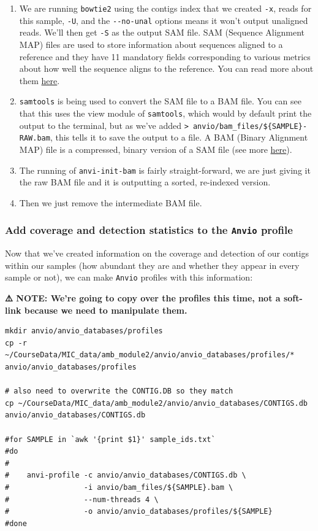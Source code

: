 \documentclass[
]{book}
\providecommand{\tightlist}{%
  \setlength{\itemsep}{0pt}\setlength{\parskip}{0pt}}
\begin{document}
\begin{enumerate}
\def\labelenumi{\arabic{enumi}.}
\tightlist
\item
  We are running \texttt{bowtie2} using the contigs index that we created \texttt{-x}, reads for this sample, \texttt{-U}, and the \texttt{-\/-no-unal} options means it won't output unaligned reads. We'll then get \texttt{-S} as the output SAM file. SAM (Sequence Alignment MAP) files are used to store information about sequences aligned to a reference and they have 11 mandatory fields corresponding to various metrics about how well the sequence aligns to the reference. You can read more about them \href{https://samtools.github.io/hts-specs/SAMv1.pdf}{here}.
\item
  \texttt{samtools} is being used to convert the SAM file to a BAM file. You can see that this uses the view module of \texttt{samtools}, which would by default print the output to the terminal, but as we've added \texttt{\textgreater{}\ anvio/bam\_files/\$\{SAMPLE\}-RAW.bam}, this tells it to save the output to a file. A BAM (Binary Alignment MAP) file is a compressed, binary version of a SAM file (see more \href{https://samtools.github.io/hts-specs/SAMv1.pdf}{here}).
\item
  The running of \texttt{anvi-init-bam} is fairly straight-forward, we are just giving it the raw BAM file and it is outputting a sorted, re-indexed version.
\item
  Then we just remove the intermediate BAM file.
\end{enumerate}

\subsubsection{\texorpdfstring{Add coverage and detection statistics to the \texttt{Anvi\textquotesingle{}o} profile}{Add coverage and detection statistics to the Anvi\textquotesingle o profile}}\label{add-coverage-and-detection-statistics-to-the-anvio-profile}

Now that we've created information on the coverage and detection of our contigs within our samples (how abundant they are and whether they appear in every sample or not), we can make \texttt{Anvi\textquotesingle{}o} profiles with this information:

\textbf{⚠️ NOTE: We're going to copy over the profiles this time, not a soft-link because we need to manipulate them.}

\begin{verbatim}
mkdir anvio/anvio_databases/profiles
cp -r ~/CourseData/MIC_data/amb_module2/anvio/anvio_databases/profiles/* anvio/anvio_databases/profiles

# also need to overwrite the CONTIG.DB so they match
cp ~/CourseData/MIC_data/amb_module2/anvio/anvio_databases/CONTIGS.db  anvio/anvio_databases/CONTIGS.db 

#for SAMPLE in `awk '{print $1}' sample_ids.txt`
#do
#
#    anvi-profile -c anvio/anvio_databases/CONTIGS.db \
#                 -i anvio/bam_files/${SAMPLE}.bam \
#                 --num-threads 4 \
#                 -o anvio/anvio_databases/profiles/${SAMPLE}
#done
\end{verbatim}
\end{document}
